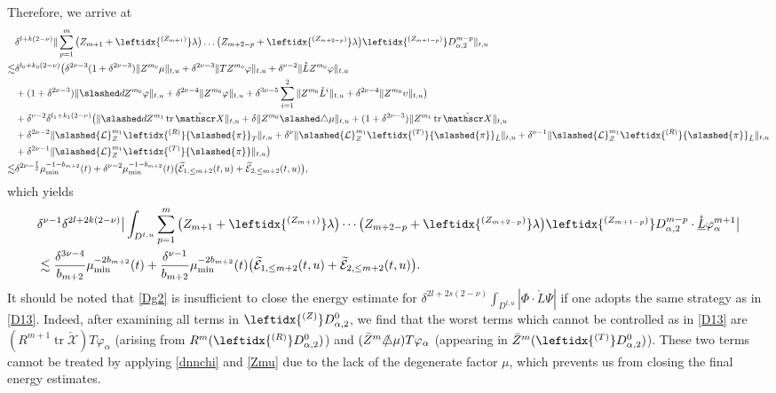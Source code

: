 \documentclass[11pt,twoside]{article}
\def\al{\alpha}
\def\vp{\varphi}
\def\f{\frac}
\begin{document}
\begin{enumerate}
Therefore, we arrive at
\begin{align}
&\delta^{l+k(2-\nu)}\|\sum_{p=1}^{m}\big(Z_{m+1}+\leftidx{^{(Z_{m+1})}}\lambda\big)\dots\big(Z_{m+2-p}
+\leftidx{^{(Z_{m+2-p})}}\lambda\big)\leftidx{^{(Z_{m+1-p})}}D_{\al,2}^{m-p}\|_{t,u}\nonumber \\
\lesssim &\delta^{l_0+k_0(2-\nu)}\big(\delta^{2\nu-3}(1+\delta^{2\nu-3})\|Z^{m_0}\mu\|_{t,u}+\delta^{2\nu-3}\|TZ^{m_0}\vp\|_{t,u}
+\delta^{\nu-2}\|\mathring LZ^{m_0}\vp\|_{t,u}\nonumber\\
&+(1+\delta^{2\nu-3})\|\slashed dZ^{m_0}\vp\|_{t,u}+\delta^{2\nu-4}\|Z^{m_0}\vp\|_{t,u}
+\delta^{3\nu-5}\sum_{i=1}^2\|Z^{m_0}\check L^i\|_{t,u}+\delta^{2\nu-4}\|Z^{m_0}\upsilon\|_{t,u}\big)\nonumber\\
&+\delta^{\nu-2}\delta^{l_1+k_1(2-\nu)}\big(\|\slashed dZ^{m_1}\operatorname{tr}\check{\mathscr X}\|_{t,u}+\delta\|Z^{m_0}\slashed\triangle\mu\|_{t,u}+(1+\delta^{2\nu-3})\|Z^{m_1}\operatorname{tr}\check{\mathscr X}\|_{t,u}\nonumber\\
&+\delta^{2\nu-2}\|\slashed{\mathcal{L}}_{{Z}}^{m_1}\leftidx{^{(R)}}{\slashed{\pi}}_T\|_{t,u}
+\delta^{\nu}\|\slashed{\mathcal{L}}_{{Z}}^{m_1}\leftidx{^{(T)}}{\slashed{\pi}}_{\mathring L}\|_{t,u}+\delta^{\nu-1}\|\slashed{\mathcal{L}}_{{Z}}^{m_1}\leftidx{^{(R)}}{\slashed{\pi}}_{\mathring L}\|_{t,u}\nonumber\\
&+\delta^{2\nu-1}\|\slashed{\mathcal{L}}_{{Z}}^{m_1}\leftidx{^{(T)}}{\slashed{\pi}}\|_{t,u}\big)\nonumber\\
\lesssim &\delta^{2\nu-\f72}\mu_{\min}^{-1-b_{m+2}}(t)+\delta^{\nu-2}\mu_{\min}^{-1-b_{m+2}}(t)\big({\widetilde{\mathcal{E}}_{1,\leq m+2}(t,u)}
+{\widetilde{\mathcal{E}}_{2,\leq m+2}(t,u)}
\big),\label{Dg2}
\end{align}
which yields
\begin{align}
&\delta^{\nu-1}\delta^{2l+2k(2-\nu)}
\big|
\int_{D^{t, u}}
\sum_{p=1}^{m}
\big(Z_{m+1}+\leftidx{^{(Z_{m+1})}}\lambda\big)
\cdots
\big(Z_{m+2-p}+\leftidx{^{(Z_{m+2-p})}}\lambda\big)
\leftidx{^{(Z_{m+1-p})}}D_{\al,2}^{m-p}
\cdot\mathring{\underline L}\varphi_\al^{m+1}
\big|\notag\\
&\lesssim\f{\delta^{3\nu-4}}{b_{m+2}}\mu_{\min}^{-2b_{m+2}}(t)+\f{\delta^{\nu-1}}{b_{m+2}}\mu_{\min}^{-2b_{m+2}}(t)
\big({\widetilde{\mathcal{E}}_{1,\leq m+2}(t,u)}
+{\widetilde{\mathcal{E}}_{2,\leq m+2}(t,u)}
\big).\label{iDg2}
\end{align}
It should be noted that \eqref{Dg2} is insufficient to close the energy estimate for $\delta^{2l+2s(2-\nu)}\int_{D^{t, u}}|\Phi \cdot \mathring{L}\Psi|$ if one adopts the same strategy as in \eqref{D13}. Indeed, after examining all terms in $\leftidx{^{(Z)}}D_{\al,2}^{0}$, we find that the worst terms which cannot be controlled as in \eqref{D13} are $(R^{m+1}\operatorname{tr}\check{\mathscr{X}})T\vp_\al$ (arising from $R^m(\leftidx{^{(R)}}D_{\al,2}^{0})$) and $(\bar{Z}^m\slashed{\triangle}\mu) T\vp_\al$ (appearing in $\bar{Z}^m(\leftidx{^{(T)}}D_{\al,2}^{0})$). These two terms cannot be treated by applying \eqref{dnnchi} and \eqref{Zmu}
due to the lack of the degenerate factor $\mu$, which prevents us from closing the final energy estimates.


\end{enumerate}
\end{document}
